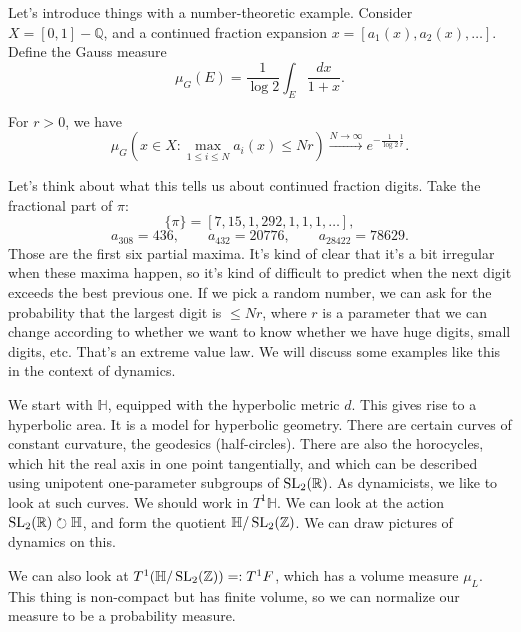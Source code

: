 \documentclass[reqno]{amsart} 
\numberwithin{theorem}{section}
\numberwithin{equation}{section}
\begin{document}
Let's introduce things with a number-theoretic example.  Consider $X =[0, 1] - \mathbb{Q}$, and a continued fraction expansion $x =[a_1(x), a_2(x), \dotsc]$.  Define the Gauss measure
\begin{equation*}
  \mu_G(E) = \frac{1}{\log 2} \int_E \frac{d x}{1 + x}.
\end{equation*}
\begin{theorem}[Galambos 1972]
  For $r > 0$, we have
  \begin{equation*}
    \mu_G \left( x \in X : \max_{1 \leq i \leq N} a_i(x) \leq N r \right)
    \xrightarrow{N \rightarrow \infty}
    e^{- \frac{1}{\log 2} \frac{1}{r}}.
  \end{equation*}
\end{theorem}
Let's think about what this tells us about continued fraction digits.  Take the fractional part of $\pi$:
\begin{equation*}
  \{\pi\} =[7, 15, 1, 292, 1, 1, 1, \dotsc],
\end{equation*}
\begin{equation*}
  a_{3 08} = 436, \qquad
  a_{432} = 20776,
  \qquad a_{28422} = 78629.
\end{equation*}
Those are the first six partial maxima.  It's kind of clear that it's a bit irregular when these maxima happen, so it's kind of difficult to predict when the next digit exceeds the best previous one.  If we pick a random number, we can ask for the probability that the largest digit is $\leq N r$, where $r$ is a parameter that we can change according to whether we want to know whether we have huge digits, small digits, etc.  That's an extreme value law.  We will discuss some examples like this in the context of dynamics.

We start with $\mathbb{H}$, equipped with the hyperbolic metric $d$.  This gives rise to a hyperbolic area.  It is a model for hyperbolic geometry.  There are certain curves of constant curvature, the geodesics (half-circles).  There are also the horocycles, which hit the real axis in one point tangentially, and which can be described using unipotent one-parameter subgroups of $\operatorname{SL}_2(\mathbb{R})$.  As dynamicists, we like to look at such curves.  We should work in $T^1 \mathbb{H}$.  We can look at the action $\operatorname{SL}_2(\mathbb{R}) \circlearrowright \mathbb{H}$, and form the quotient $\mathbb{H} / \operatorname{SL}_2(\mathbb{Z})$.  We can draw pictures of dynamics on this.  

We can also look at $T^1(\mathbb{H} / \operatorname{SL}_2(\mathbb{Z})) =: T^1 F$, which has a volume measure $\mu_L$.  This thing is non-compact but has finite volume, so we can normalize our measure to be a probability measure.
\end{document}
